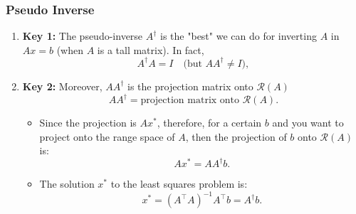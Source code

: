 \subsubsection{Pseudo Inverse}
\begin{intuition}
    \begin{enumerate}
        \item \textbf{Key 1:} The pseudo-inverse \(A^\dagger\) is the "best" we can do for inverting \(A\) in \(A x = b\) (when \(A\) is a tall matrix). In fact,
        \[
        A^\dagger A = I \quad \text{(but } A A^\dagger \neq I\text{)},
        \]
        
        \item \textbf{Key 2:} Moreover, $AA^\dagger$ is the projection matrix onto $\mathcal{R}(A)$
        \[
        A A^\dagger = \text{projection matrix onto } \mathcal{R}(A).
        \]
        \begin{itemize}
            \item Since the projection is $Ax^*$, therefore, for a certain $b$ and you want to project onto the range space of $A$, then the projection of \(b\) onto \(\mathcal{R}(A)\) is:
            \[
            A x^* = A A^\dagger b.
            \]
            \item The solution \(x^*\) to the least squares problem is:
            \[
            x^* = (A^\top A)^{-1} A^\top b = A^\dagger b.
            \]
        \end{itemize}

    \end{enumerate}
\end{intuition}

